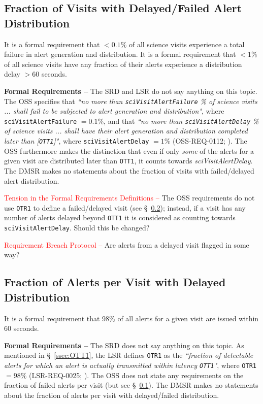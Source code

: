 \documentclass[DM,authoryear,toc]{lsstdoc}
\begin{document}
\subsection{Fraction of Visits with Delayed/Failed Alert Distribution}\label{ssec:sciVisitAlertFailure}

It is a formal requirement that $<0.1\%$ of all science visits experience a total failure in alert generation and distribution. It is a formal requirement that $<1\%$ of all science visits have any fraction of their alerts experience a distribution delay $>60$ seconds.

{\bf Formal Requirements --} The SRD and LSR do not say anything on this topic. The OSS specifies that {\it ``no more than {\tt sciVisitAlertFailure} \% of science visits ... shall fail to be subjected to alert generation and distribution"}, where {\tt sciVisitAlertFailure} $=0.1\%$, and that {\it ``no more than {\tt sciVisitAlertDelay} \% of science visits ... shall have their alert generation and distribution completed later than [{\tt OTT1}]"}, where {\tt sciVisitAlertDelay} $=1\%$ (OSS-REQ-0112; ). The OSS furthermore makes the distinction that even if only {\it some} of the alerts for a given visit are distributed later than {\tt OTT1}, it counts towards {\it sciVisitAlertDelay}. The DMSR makes no statements about the fraction of visits with failed/delayed alert distribution.

\textcolor{red}{Tension in the Formal Requirements Definitions --} The OSS requirements do not use {\tt OTR1} to define a failed/delayed visit (see \S~\ref{ssec:OTR1}); instead, if a visit has any number of alerts delayed beyond {\tt OTT1} it is considered as counting towards {\tt sciVisitAlertDelay}. Should this be changed?

\textcolor{red}{Requirement Breach Protocol --} Are alerts from a delayed visit flagged in some way?


\subsection{Fraction of Alerts per Visit with Delayed Distribution}\label{ssec:OTR1}

It is a formal requirement that $98\%$ of all alerts for a given visit are issued within $60$ seconds.

{\bf Formal Requirements --} The SRD does not say anything on this topic. As mentioned in \S~\ref{ssec:OTT1}, the LSR defines {\tt OTR1} as the {\it ``fraction of detectable alerts for which an alert is actually transmitted within latency {\tt OTT1}"}, where {\tt OTR1} $=98\%$ (LSR-REQ-0025; ). The OSS does not state any requirements on the fraction of failed alerts per visit (but see \S~\ref{ssec:sciVisitAlertFailure}). The DMSR makes no statements about the fraction of alerts per visit with delayed/failed distribution.
\end{document}
